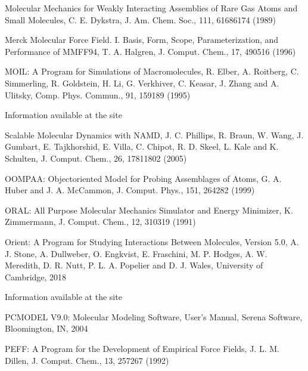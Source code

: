\documentclass[letterpaper,11pt,english]{sphinxmanual}
\begin{document}
Molecular Mechanics for Weakly Interacting Assemblies of Rare Gas Atoms and Small Molecules, C. E. Dykstra, J. Am. Chem. Soc., 111, 6168\sphinxhyphen{}6174 (1989)


Merck Molecular Force Field. I. Basis, Form, Scope, Parameterization, and Performance of MMFF94, T. A. Halgren, J. Comput. Chem., 17, 490\sphinxhyphen{}516 (1996)


MOIL: A Program for Simulations of Macromolecules, R. Elber, A. Roitberg, C. Simmerling, R. Goldstein, H. Li, G. Verkhiver, C. Keasar, J. Zhang and A. Ulitsky, Comp. Phys. Commun., 91, 159\sphinxhyphen{}189 (1995)


Information available at the site 


Scalable Molecular Dynamics with NAMD, J. C. Phillips, R. Braun, W. Wang, J. Gumbart, E. Tajkhorshid, E. Villa, C. Chipot, R. D. Skeel, L. Kale and K. Schulten, J. Comput. Chem., 26, 1781\sphinxhyphen{}1802 (2005)


OOMPAA: Object\sphinxhyphen{}oriented Model for Probing Assemblages of Atoms, G. A. Huber and J. A. McCammon, J. Comput. Phys., 151, 264\sphinxhyphen{}282 (1999)


ORAL: All Purpose Molecular Mechanics Simulator and Energy Minimizer, K. Zimmermann, J. Comput. Chem., 12, 310\sphinxhyphen{}319 (1991)


Orient: A Program for Studying Interactions Between Molecules, Version 5.0, A. J. Stone, A. Dullweber, O. Engkvist, E. Fraschini, M. P. Hodges, A. W. Meredith, D. R. Nutt, P. L. A. Popelier and D. J. Wales, University of Cambridge, 2018

Information available at the site 


PCMODEL V9.0: Molecular Modeling Software, User’s Manual, Serena Software, Bloomington, IN, 2004


PEFF: A Program for the Development of Empirical Force Fields, J. L. M. Dillen, J. Comput. Chem., 13, 257\sphinxhyphen{}267 (1992)
\end{document}
